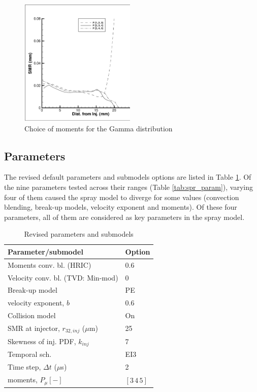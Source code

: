 \documentclass[a4paper,10pt]{article}
\begin{document}
\begin{figure}[H]
\centering
\includegraphics[width=0.49\textwidth]{pc_900_cl.eps}
\caption{Choice of moments for the Gamma distribution}
\label{fig:mom_gam}
\end{figure}



\subsection{Parameters}
The revised default parameters and submodels options are listed in Table \ref{tab:spr_param_final}. Of the nine parameters tested across their ranges (Table \ref{tab:spr_param}), varying four of them caused the spray model to diverge for some values (convection blending, break-up models, velocity exponent and moments). Of these four parameters, all of them are considered as key parameters in the spray model.

\begin{table}[H]
\caption{Revised parameters and submodels}
\vspace{2mm}
\centering
\begin{tabular}{l | l}
\hline \hline
Parameter/submodel & Option \\
\hline
Moments conv. bl. (HRIC) &  0.6 \\
Velocity conv. bl. (TVD: Min-mod) &  0 \\
\hline
Break-up model & PE \\
velocity exponent, $b$ & 0.6 \\
Collision model & On \\
\hline
SMR at injector, $r_{32,inj}$ ($\mu$m) & 25 \\
Skewness of inj. PDF, $k_{inj}$ & 7 \\
\hline
Temporal sch. & EI3 \\
Time step, $\Delta t$ ($\mu$s) & 2 \\
\hline
moments, $P_{\mu}[-]$ & $[3\,4\,5]$ \\
\end{tabular}
\label{tab:spr_param_final}
\end{table}
\end{document}
